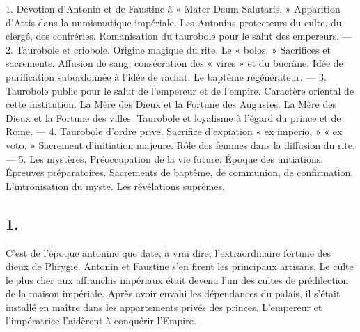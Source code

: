 \documentclass[a4paper, 11pt, oneside, polutonikogreek, french]{article}
\begin{document}
1. Dévotion d'Antonin et de Faustine à « Mater Deum Salutaris. » Apparition d'Attis dans la numismatique impériale. Les Antonins protecteurs du culte, du clergé, des confréries. Romanisation du taurobole pour le salut des empereurs. --- 2. Taurobole et criobole. Origine magique du rite. Le « bolos. » Sacrifices et sacrements. Affusion de sang, consécration des « vires » et du bucrâne. Idée de purification subordonnée à l'idée de rachat. Le baptême régénérateur. --- 3. Taurobole public pour le salut de l'empereur et de l'empire. Caractère oriental de cette institution. La Mère des Dieux et la Fortune des Augustes. La Mère des Dieux et la Fortune des villes. Taurobole et loyalisme à l'égard du prince et de Rome. --- 4. Taurobole d'ordre privé. Sacrifice d'expiation « ex imperio, » « ex voto. » Sacrement d'initiation majeure. Rôle des femmes dans la diffusion du rite. --- 5. Les mystères. Préoccupation de la vie future. Époque des initiations. Épreuves préparatoires. Sacrements de baptême, de communion, de confirmation. L'intronisation du myste. Les révélations suprêmes.

\subsection{1.}

C'est de l'époque antonine que date, à vrai dire, l'extraordinaire fortune des dieux de Phrygie. Antonin et Faustine s'en firent les principaux artisans. Le culte le plus cher aux affranchis impériaux était devenu l'un des cultes de prédilection de la maison impériale. Après avoir envahi les dépendances du palais, il s'était installé en maître dans les appartements privés des princes. L'empereur et l'impératrice l'aidèrent à conquérir l'Empire.
\end{document}
